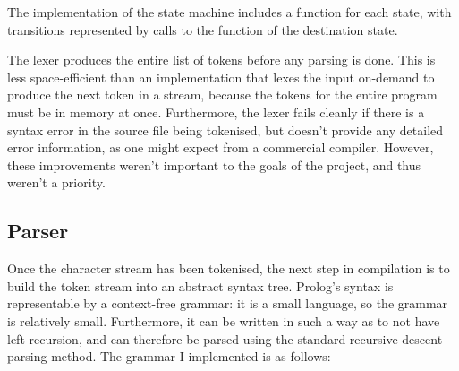 \documentclass[12pt]{article}
\begin{document}
The implementation of the state machine includes a function for each state, with transitions represented by calls to the function of the destination state.

The lexer produces the entire list of tokens before any parsing is done. 
This is less space-efficient than an implementation that lexes the input on-demand to produce the next token in a stream, because the tokens for the entire program must be in memory at once. 
Furthermore, the lexer fails cleanly if there is a syntax error in the source file being tokenised, but doesn't provide any detailed error information, as one might expect from a commercial compiler. 
However, these improvements weren't important to the goals of the project, and thus weren't a priority.

\subsection{Parser}

Once the character stream has been tokenised, the next step in compilation is to build the token stream into an abstract syntax tree. 
Prolog's syntax is representable by a context-free grammar: it is a small language, so the grammar is relatively small. 
Furthermore, it can be written in such a way as to not have left recursion, and can therefore be parsed using the standard recursive descent parsing method. 
The grammar I implemented is as follows:

\newpage
\end{document}
